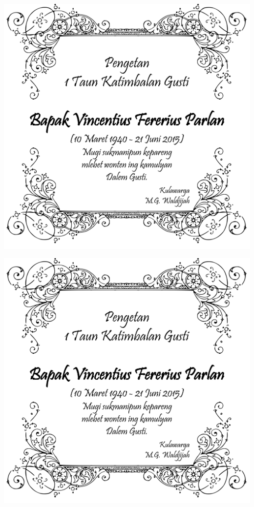 \documentclass[12pt,a4paper]{article}
\author{Yohanes Suyanto}
\begin{document}
\begin{center}
\thispagestyle{empty}
\vspace{0.125cm}
\includegraphics[scale=1]{Pengetan-1-tahun.png}

\vspace{0.25cm}

\includegraphics[scale=1]{Pengetan-1-tahun.png}
\end{center}
\end{document}
